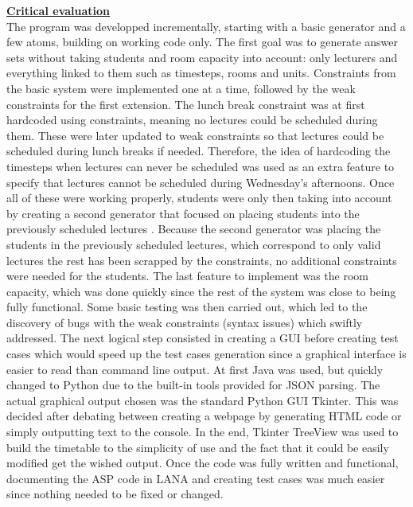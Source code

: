 \documentclass{article}
\begin{document}
	\begin{large}
	
	
		\underline{\textbf{Critical evaluation}}\\
		
		The program was developped incrementally, starting with a basic generator and a few atoms, building on working code only. 
		The first goal was to generate answer sets without taking students and room capacity into account: only lecturers and everything linked to them such as timesteps, rooms and units. 
		Constraints from the basic system were implemented one at a time, followed by the weak constraints for the first extension. 
		The lunch break constraint was at first hardcoded using constraints, meaning no lectures could be scheduled during them. 
		These were later updated to weak constraints so that lectures could be scheduled during lunch breaks if needed. 
		Therefore, the idea of hardcoding the timesteps when lectures can never be scheduled was used as an extra feature to specify that lectures cannot be scheduled during Wednesday's afternoons. 
		Once all of these were working properly, students were only then taking into account by creating a second generator that focused on placing students into the previously scheduled lectures . 
		Because the second generator was placing the students in the previously scheduled lectures, which correspond to only valid lectures the rest has been scrapped by the constraints, no additional constraints were needed for the students. 
		The last feature to implement was the room capacity, which was done quickly since the rest of the system was close to being fully functional. 
		Some basic testing was then carried out, which led to the discovery of bugs with the weak constraints (syntax issues) which swiftly addressed.
		The next logical step consisted in creating a GUI before creating test cases which would speed up the test cases generation since a graphical interface is easier to read than command line output.
		At first Java was used, but quickly changed to Python due to the built-in tools provided for JSON parsing. 
		The actual graphical output chosen was the standard Python GUI Tkinter. 
		This was decided after debating between creating a webpage by generating HTML code or simply outputting text to the console.
		In the end, Tkinter TreeView was used to build the timetable to the simplicity of use and the fact that it could be easily modified get the wished output.
		Once the code was fully written and functional, documenting the ASP code in LANA and creating test cases was much easier since nothing needed to be fixed or changed.
		\newline
		

\end{large}
\end{document}
